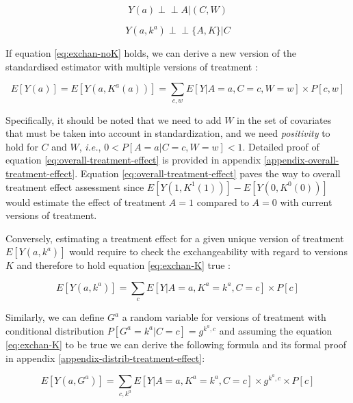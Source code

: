 \documentclass[a4paper,12pt,twoside,onecolumn,openright,final,oldfontcommands]{memoir}
\begin{document}
\begin{equation}
Y(a) \perp \!\!\! \perp A | (C,W)
\label{eq:exchan-noK}
\end{equation}

\begin{equation}
Y(a, k^a) \perp \!\!\! \perp \{A, K\} | C
\label{eq:exchan-K}
\end{equation}

If equation \eqref{eq:exchan-noK} holds, we can derive a new version of
the standardised estimator with multiple versions of treatment
\citep{vanderweele2013causal}:

\begin{equation}
E[Y(a)] = E[Y(a, K^a(a))] = \sum_{c,w} E[Y | A=a, C=c, W=w] \times P[c,w]
\label{eq:overall-treatment-effect}
\end{equation}

Specifically, it should be noted that we need to add \(W\) in the set of
covariates that must be taken into account in standardization, and we
need \emph{positivity} to hold for \(C\) and \(W\), \emph{i.e.},
\(0<P[A=a|C=c,W=w]<1\). Detailed proof of equation
\eqref{eq:overall-treatment-effect} is provided in appendix
\ref{appendix-overall-treatment-effect}. Equation
\eqref{eq:overall-treatment-effect} paves the way to overall treatment
effect assessment since \(E[Y(1, K^1(1))]-E[Y(0, K^0(0))]\) would
estimate the effect of treatment \(A=1\) compared to \(A=0\) with
current versions of treatment.

Conversely, estimating a treatment effect for a given unique version of
treatment \(E[Y(a,k^a)]\) would require to check the exchangeability
with regard to versions \(K\) and therefore to hold equation
\eqref{eq:exchan-K} true \citep{vanderweele2013causal}:

\begin{equation}
E[Y(a, k^a)] = \sum_{c} E[Y | A=a,K^a=k^a, C=c] \times P[c]
\label{eq:version-treatment-effect}
\end{equation}

Similarly, we can define \(G^a\) a random variable for versions of
treatment with conditional distribution \(P[G^a=k^a| C=c]=g^{k^a,c}\)
and assuming the equation \eqref{eq:exchan-K} to be true we can derive the
following formula and its formal proof in appendix
\ref{appendix-distrib-treatment-effect}:

\begin{equation}
E[Y(a, G^a)] = \sum_{c,k^a} E[Y | A=a,K^a=k^a, C=c] \times g^{k^a,c} \times P[c]
\label{eq:distrib-treatment-effect}
\end{equation}
\end{document}
